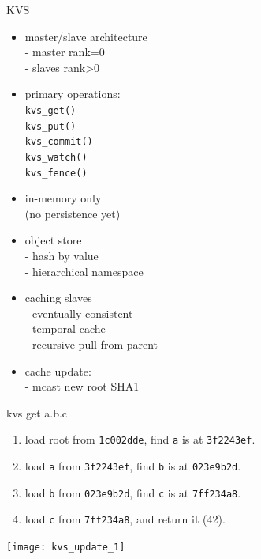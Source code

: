 \documentclass[default,pdf,colorBG,slideColor]{prosper}
\begin{document}
\begin{slide}{KVS}{\small
\begin{minipage}{0.50\textwidth}
\begin{itemize}
  \item{master/slave architecture\\
        - master rank=0 \\
        - slaves rank>0 }
  \item{primary operations:\\
        {\tt kvs\_get()}\\
        {\tt kvs\_put()}\\
        {\tt kvs\_commit()}\\
        {\tt kvs\_watch()}\\
        {\tt kvs\_fence()}}
  \item{in-memory only\\
        (no persistence yet)}
 \end{itemize}
\end{minipage}
\begin{minipage}{0.50\textwidth}
\begin{itemize}
  \item{object store\\
        - hash by value\\
        - hierarchical namespace}
  \item{caching slaves\\
        - eventually consistent\\
        - temporal cache\\
        - recursive pull from parent}
  \item{cache update:\\
        - mcast new root SHA1}
\end{itemize}
\end{minipage}
}\end{slide}

\begin{slide}{kvs get a.b.c}{\small
\begin{minipage}{0.50\textwidth}
\begin{enumerate}
\item{load root from {\tt 1c002dde}, find {\tt a} is at
{\tt 3f2243ef}.}
\item{load {\tt a} from {\tt 3f2243ef}, find {\tt b} is at
{\tt 023e9b2d}.}
\item{load {\tt b} from {\tt 023e9b2d}, find {\tt c} is at
{\tt 7ff234a8}.}
\item{load {\tt c} from {\tt 7ff234a8}, and return it (42).}
\end{enumerate}
\end{minipage}
\begin{minipage}[t]{0.50\textwidth}
\begin{center}
  \texttt{[image: kvs\_update\_1]}
\end{center}
\end{minipage}
}\end{slide}
\end{document}
